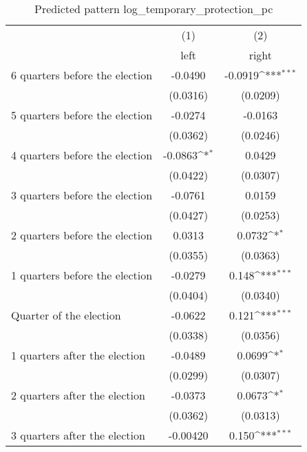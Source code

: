 \begin{table}[htbp]\centering
\def\sym#1{\ifmmode^{#1}\else\(^{#1}\)\fi}
\caption{Predicted pattern log\_temporary\_protection\_pc}
\begin{tabular}{l*{2}{c}}
\hline\hline
                    &\multicolumn{1}{c}{(1)}&\multicolumn{1}{c}{(2)}\\
                    &\multicolumn{1}{c}{left}&\multicolumn{1}{c}{right}\\
\hline
 6 quarters before the election&     -0.0490         &     -0.0919\sym{***}\\
                    &    (0.0316)         &    (0.0209)         \\
[1em]
 5 quarters before the election&     -0.0274         &     -0.0163         \\
                    &    (0.0362)         &    (0.0246)         \\
[1em]
 4 quarters before the election&     -0.0863\sym{*}  &      0.0429         \\
                    &    (0.0422)         &    (0.0307)         \\
[1em]
 3 quarters before the election&     -0.0761         &      0.0159         \\
                    &    (0.0427)         &    (0.0253)         \\
[1em]
 2 quarters before the election&      0.0313         &      0.0732\sym{*}  \\
                    &    (0.0355)         &    (0.0363)         \\
[1em]
 1 quarters before the election&     -0.0279         &       0.148\sym{***}\\
                    &    (0.0404)         &    (0.0340)         \\
[1em]
Quarter of the election&     -0.0622         &       0.121\sym{***}\\
                    &    (0.0338)         &    (0.0356)         \\
[1em]
 1 quarters after the election&     -0.0489         &      0.0699\sym{*}  \\
                    &    (0.0299)         &    (0.0307)         \\
[1em]
 2 quarters after the election&     -0.0373         &      0.0673\sym{*}  \\
                    &    (0.0362)         &    (0.0313)         \\
[1em]
 3 quarters after the election&    -0.00420         &       0.150\sym{***}\\

\end{tabular}
\end{table}
